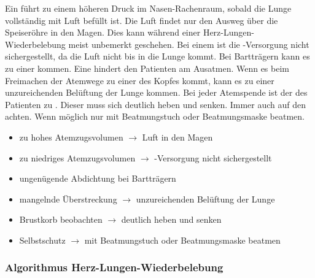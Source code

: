 {
Ein  führt zu einem
höheren Druck im Nasen-Rachenraum, sobald die Lunge
vollständig mit Luft befüllt ist. Die Luft findet nur den
Ausweg über die Speiseröhre in den Magen. Dies kann während einer Herz-Lungen-Wiederbelebung meist unbemerkt geschehen. Bei einem  ist die
-Versorgung nicht sichergestellt, da die Luft nicht bis in die
Lunge kommt. Bei Bartträgern kann es zu einer
 kommen. Eine  hindert den Patienten am Ausatmen. Wenn es beim Freimachen
der Atemwege zu einer  des Kopfes
kommt, kann es zu einer unzureichenden Belüftung der Lunge kommen. Bei jeder Atemspende ist der  des Patienten zu . Dieser
muss sich deutlich heben und senken. Immer auch auf den 
achten. Wenn möglich nur mit Beatmungstuch oder Beatmungsmaske beatmen.
}{
\begin{itemize}
    \item zu hohes Atemzugsvolumen ${\rightarrow}$ Luft in den Magen
    \item zu niedriges Atemzugsvolumen ${\rightarrow}$ -Versorgung nicht
    sichergestellt
    \item ungenügende Abdichtung bei Bartträgern
    \item mangelnde Überstreckung ${\rightarrow}$ unzureichenden Belüftung der
    Lunge
    \item Brustkorb beobachten ${\rightarrow}$ deutlich heben und senken
    \item Selbstschutz ${\rightarrow}$ mit Beatmungstuch oder Beatmungsmaske
    beatmen
\end{itemize}
}{}{}{}

\subsubsection{Algorithmus Herz-Lungen-Wiederbelebung}


